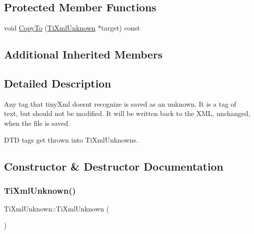 \subsection*{Protected Member Functions}
\begin{DoxyCompactItemize}
\item 
void \hyperlink{class_ti_xml_unknown_afeb334446bcbe13ce15131e1629712be}{Copy\+To} (\hyperlink{class_ti_xml_unknown}{Ti\+Xml\+Unknown} $\ast$target) const
\end{DoxyCompactItemize}
\subsection*{Additional Inherited Members}


\subsection{Detailed Description}
Any tag that tiny\+Xml doesn\textquotesingle{}t recognize is saved as an unknown. It is a tag of text, but should not be modified. It will be written back to the X\+ML, unchanged, when the file is saved.

D\+TD tags get thrown into Ti\+Xml\+Unknowns. 

\subsection{Constructor \& Destructor Documentation}
\mbox{\label{class_ti_xml_unknown_a945f09b3c6538099c69fc563216750c3}} 
\subsubsection{\texorpdfstring{Ti\+Xml\+Unknown()}{TiXmlUnknown()}\hspace{0.1cm}{\footnotesize\ttfamily [1/2]}}
{\footnotesize\ttfamily Ti\+Xml\+Unknown\+::\+Ti\+Xml\+Unknown (\begin{DoxyParamCaption}{ }\end{DoxyParamCaption})\hspace{0.3cm}{\ttfamily [inline]}}

\mbox{\label{class_ti_xml_unknown_ac21966c3b551553d760b4a339c9acda0}} 
